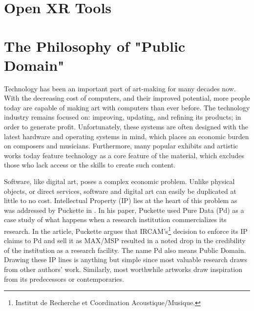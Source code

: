 


\section{Open XR Tools}

\section{The Philosophy of "Public Domain"}



Technology has been an important part of art-making for many decades now. With the decreasing cost of computers, and their improved potential, more people today are capable of making art with computers than ever before. The technology industry remains focused on: improving, updating, and refining its products; in order to generate profit. Unfortunately, these systems are often designed with the latest hardware and operating systems in mind, which places an economic burden on composers and musicians. Furthermore, many popular exhibits and artistic works today feature technology as a core feature of the material, which excludes those who lack access or the skills to create such content.

Software, like digital art, poses a complex economic problem. Unlike physical objects, or direct services, software and digital art can easily be duplicated at little to no cost. Intellectual Property (IP) lies at the heart of this problem as was addressed by Puckette in \cite{puckette2004owns}. In his paper, Puckette used Pure Data (Pd) as a case study of what happens when a research institution commercializes its research. In the article, Puckette argues that IRCAM's\footnote{Institut de Recherche et Coordination Acoustique/Musique.} decision to enforce its IP claims to Pd and sell it as MAX/MSP resulted in a noted drop in the credibility of the institution as a research facility. The name Pd also means Public Domain. Drawing these IP lines is anything but simple since most valuable research draws from other authors' work. Similarly, most worthwhile artworks draw inspiration from its predecessors or contemporaries.

